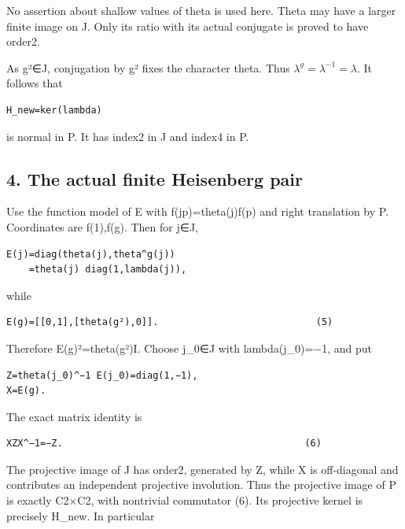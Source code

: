 No assertion about shallow values of theta is used here. Theta may have
a larger finite image on J. Only its ratio with its actual conjugate is
proved to have order2.

As g²∈J, conjugation by g² fixes the character theta. Thus
\(\lambda^g=\lambda^{-1}=\lambda\). It follows that

\begin{Verbatim}[fontsize=\small,breaklines=true,breakanywhere=true]
H_new=ker(lambda)
\end{Verbatim}

is normal in P. It has index2 in J and index4 in P.

\hypertarget{rank2-the-actual-finite-heisenberg-pair}{%
\subsection{4. The actual finite Heisenberg
pair}\label{rank2-the-actual-finite-heisenberg-pair}}

Use the function model of E with f(jp)=theta(j)f(p) and right
translation by P. Coordinates are f(1),f(g). Then for j∈J,

\begin{Verbatim}[fontsize=\small,breaklines=true,breakanywhere=true]
E(j)=diag(theta(j),theta^g(j))
    =theta(j) diag(1,lambda(j)),
\end{Verbatim}

while

\begin{Verbatim}[fontsize=\small,breaklines=true,breakanywhere=true]
E(g)=[[0,1],[theta(g²),0]].                            (5)
\end{Verbatim}

Therefore E(g)²=theta(g²)I. Choose j\_0∈J with lambda(j\_0)=−1, and put

\begin{Verbatim}[fontsize=\small,breaklines=true,breakanywhere=true]
Z=theta(j_0)^−1 E(j_0)=diag(1,−1),
X=E(g).
\end{Verbatim}

The exact matrix identity is

\begin{Verbatim}[fontsize=\small,breaklines=true,breakanywhere=true]
XZX^−1=−Z.                                           (6)
\end{Verbatim}

The projective image of J has order2, generated by Z, while X is
off-diagonal and contributes an independent projective involution. Thus
the projective image of P is exactly C2×C2, with nontrivial commutator
(6). Its projective kernel is precisely H\_new. In particular

